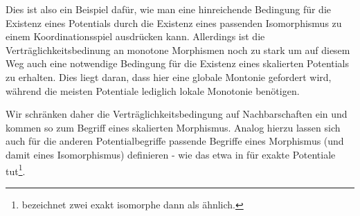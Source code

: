 Dies ist also ein Beispiel dafür, wie man eine hinreichende Bedingung für die Existenz eines Potentials durch die Existenz eines passenden Isomorphismus zu einem Koordinationsspiel ausdrücken kann. Allerdings ist die Verträglichkeitsbedinung an monotone Morphismen noch zu stark um auf diesem Weg auch eine notwendige Bedingung für die Existenz eines skalierten Potentials zu erhalten. Dies liegt daran, dass hier eine globale Montonie gefordert wird, während die meisten Potentiale lediglich lokale Monotonie benötigen.


Wir schränken daher die Verträglichkeitsbedingung auf Nachbarschaften ein und kommen so zum Begriff eines skalierten Morphismus. Analog hierzu lassen sich auch für die anderen Potentialbegriffe passende Begriffe eines Morphismus (und damit eines Isomorphismus) definieren - wie das etwa \citeauthor{ReprOfFiniteGamesAsNCG} in \cite[Abschnitt 2.1]{ReprOfFiniteGamesAsNCG} für exakte Potentiale tut\footnote{\citeauthor{ReprOfFiniteGamesAsNCG} bezeichnet zwei exakt isomorphe dann als \glqq ähnlich\grqq.}.

